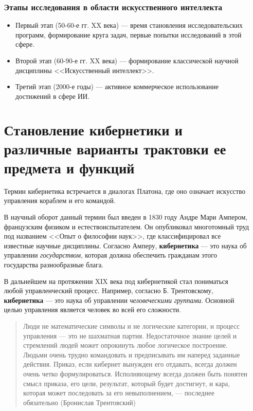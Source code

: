 \subsubsection{Этапы исследования в области искусственного интеллекта} 
\begin{itemize}
    \item Первый этап (50-60-е гг. XX века) --- время становления исследовательских программ, формирование круга задач, первые попытки исследований в этой сфере.
    \item Второй этап (60-90-е гг. XX века) --- формирование классической научной дисциплины <<Искусственный интеллект>>.
    \item Третий этап (2000-е годы) --- активное коммерческое использование достижений в сфере ИИ.
\end{itemize}

\section[Становление кибернетики, ее предмет и функции]{Становление кибернетики и различные варианты трактовки ее предмета и функций}

Термин кибернетика встречается в диалогах Платона, где оно означает искусство управления кораблем и его командой. 

В научный оборот данный термин был введен в 1830 году Андре Мари Ампером, французским физиком и естествоиспытателем. Он опубликовал многотомный труд под названием <<Опыт о философии наук>>, где классифицировал все известные научные дисциплины. Согласно Амперу, \textbf{кибернетика} --- это наука об управлении \textit{государством}, которая должна обеспечить гражданам этого государства разнообразные блага. 

В дальнейшем на протяжении XIX века под кибернетикой стал пониматься любой управленческий процесс. Например, согласно Б. Трентовскому, \textbf{кибернетика} --- это наука об управлении \textit{человеческими группами}. Основной целью управления является человек во всей его сложности.  

\begin{quote}
Люди не математические символы и не логические категории, и процесс управления — это не шахматная партия. Недостаточное знание целей и стремлений людей может опрокинуть любое логическое построение. Людьми очень трудно командовать и предписывать им наперед заданные действия. Приказ, если кибернет вынужден его отдавать, всегда должен очень четко формулироваться. Исполняющему всегда должен быть понятен смысл приказа, его цели, результат, который будет достигнут, и кара, которая может последовать за его невыполнением, — последнее обязательно \hfill (Бронислав Трентовский)
\end{quote}

